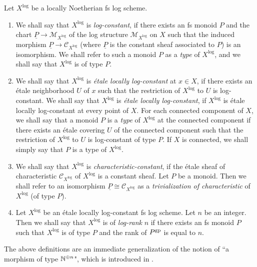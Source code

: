 

\begin{defn}
  Let $X^\log$ be a locally Noetherian fs log scheme.
  \begin{enumerate}
    \item We shall say that $X^\log$ is \emph{log-constant}, if there exists an fs monoid $P$ and the chart $\underline{P} \to \mathcal{M}_{X^\log}$ of the log structure $\mathcal{M}_{X^\log}$ on $X$ such that the induced morphism $\underline{P} \to \mathcal{C}_{X^\log}$ (where $\underline{P}$ is the constant sheaf associated to $P$) is an isomorphism. We shall refer to such a monoid $P$ as a \emph{type} of $X^\log$, and we shall say that $X^\log$ is of type $P$.
    \item We shall say that $X^\log$ is \emph{\'{e}tale locally log-constant} at $x \in X$, if there exists an \'{e}tale neighborhood $U$ of $x$ such that the restriction of $X^\log$ to $U$ is log-constant. We shall say that $X^\log$ is \emph{\'{e}tale locally log-constant}, if $X^\log$ is \'{e}tale locally log-constant at every point of $X$. For each connected component of $X$, we shall say that a monoid $P$ is a \emph{type} of $X^\log$ at the connected component if there exists an \'{e}tale covering $U$ of the connected component such that the restriction of $X^\log$ to $U$ is log-constant of type $P$. If $X$ is connected, we shall simply say that $P$ is a type of $X^\log$.
    \item We shall say that $X^\log$ is \emph{characteristic-constant}, if the \'{e}tale sheaf of characteristic $\mathcal{C}_{X^\log}$ of $X^\log$ is a constant sheaf. Let $P$ be a monoid. Then we shall refer to an isomorphism $\underline{P} \cong \mathcal{C}_{X^\log}$ as a \emph{trivialization of characteristic} of $X^\log$ (of type $P$).
    \item Let $X^\log$ be an \'{e}tale locally log-constant fs log scheme. Let $n$ be an integer. Then we shall say that $X^\log$ is of \emph{log-rank} $n$ if there exists an fs monoid $P$ such that $X^\log$ is of type $P$ and the rank of $P^{\mathrm{gp}}$ is equal to $n$.
  \end{enumerate}
\end{defn}

\begin{rem}
  The above definitions are an immediate generalization of the notion of ``a morphism of type $\mathbb{N}^{\oplus n}$", which is introduced in \cite{Hoshi1}.
\end{rem}

